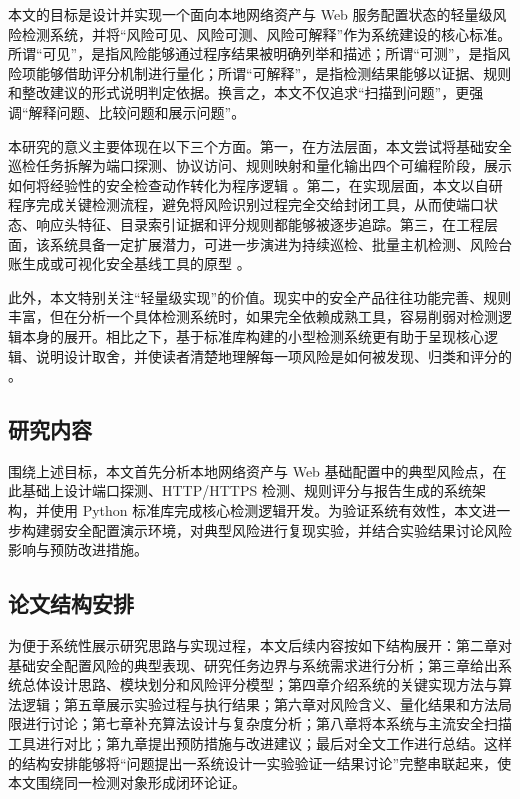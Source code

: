 \documentclass[12pt,a4paper,fontset=none]{ctexart}
\begin{document}
本文的目标是设计并实现一个面向本地网络资产与 Web 服务配置状态的轻量级风险检测系统，并将“风险可见、风险可测、风险可解释”作为系统建设的核心标准。所谓“可见”，是指风险能够通过程序结果被明确列举和描述；所谓“可测”，是指风险项能够借助评分机制进行量化；所谓“可解释”，是指检测结果能够以证据、规则和整改建议的形式说明判定依据。换言之，本文不仅追求“扫描到问题”，更强调“解释问题、比较问题和展示问题”。

本研究的意义主要体现在以下三个方面。第一，在方法层面，本文尝试将基础安全巡检任务拆解为端口探测、协议访问、规则映射和量化输出四个可编程阶段，展示如何将经验性的安全检查动作转化为程序逻辑 \cite{owasp-asvs,websec-book,practical-monitoring}。第二，在实现层面，本文以自研程序完成关键检测流程，避免将风险识别过程完全交给封闭工具，从而使端口状态、响应头特征、目录索引证据和评分规则都能够被逐步追踪。第三，在工程层面，该系统具备一定扩展潜力，可进一步演进为持续巡检、批量主机检测、风险台账生成或可视化安全基线工具的原型 \cite{nuclei,openvas,devsecops,security-automation}。

此外，本文特别关注“轻量级实现”的价值。现实中的安全产品往往功能完善、规则丰富，但在分析一个具体检测系统时，如果完全依赖成熟工具，容易削弱对检测逻辑本身的展开。相比之下，基于标准库构建的小型检测系统更有助于呈现核心逻辑、说明设计取舍，并使读者清楚地理解每一项风险是如何被发现、归类和评分的 \cite{software-security,secure-coding,threat-modeling}。

\subsection{研究内容}

围绕上述目标，本文首先分析本地网络资产与 Web 基础配置中的典型风险点，在此基础上设计端口探测、HTTP/HTTPS 检测、规则评分与报告生成的系统架构，并使用 Python 标准库完成核心检测逻辑开发。为验证系统有效性，本文进一步构建弱安全配置演示环境，对典型风险进行复现实验，并结合实验结果讨论风险影响与预防改进措施。

\subsection{论文结构安排}

为便于系统性展示研究思路与实现过程，本文后续内容按如下结构展开：第二章对基础安全配置风险的典型表现、研究任务边界与系统需求进行分析；第三章给出系统总体设计思路、模块划分和风险评分模型；第四章介绍系统的关键实现方法与算法逻辑；第五章展示实验过程与执行结果；第六章对风险含义、量化结果和方法局限进行讨论；第七章补充算法设计与复杂度分析；第八章将本系统与主流安全扫描工具进行对比；第九章提出预防措施与改进建议；最后对全文工作进行总结。这样的结构安排能够将“问题提出一系统设计一实验验证一结果讨论”完整串联起来，使本文围绕同一检测对象形成闭环论证。
\end{document}
